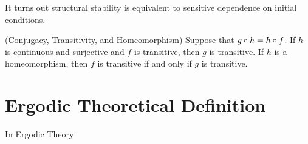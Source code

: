 \documentclass[11pt]{article}
\begin{document}
It turns out structural stability is equivalent to sensitive dependence
on initial conditions.

\begin{proposition}
  (Conjugacy, Transitivity, and Homeomorphism) 
  Suppose that $g \circ h = h \circ f$. If $h$ is continuous and
  surjective and $f$ is transitive, then $g$ is transitive.
  If $h$ is a homeomorphism, then $f$ is transitive if and only if
  $g$ is transitive.
\end{proposition}

\section{Ergodic Theoretical Definition}
In Ergodic Theory
\end{document}

